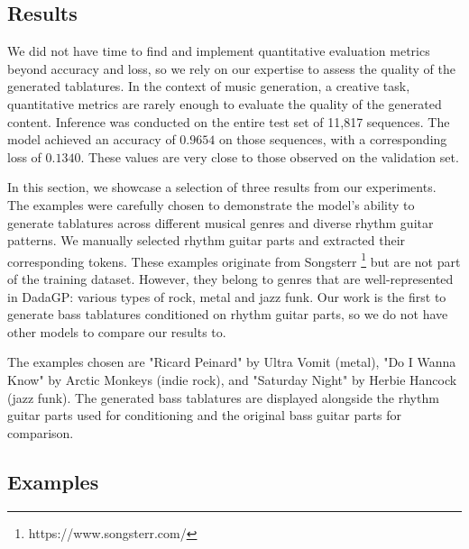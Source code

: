 \subsection{Results}

We did not have time to find and implement quantitative evaluation metrics beyond accuracy and loss, 
so we rely on our expertise to assess the quality of the generated tablatures.
In the context of music generation, a creative task, quantitative metrics are rarely enough to evaluate the quality of the generated content.
Inference was conducted on the entire test set of 11,817 sequences.
The model achieved an accuracy of $0.9654$ on those sequences, with a corresponding loss of $0.1340$.
These values are very close to those observed on the validation set.

In this section, we showcase a selection of three results from our experiments.
The examples were carefully chosen to demonstrate the model's ability to generate tablatures across different musical genres and diverse rhythm guitar patterns.
We manually selected rhythm guitar parts and extracted their corresponding tokens.
These examples originate from Songsterr \footnote{https://www.songsterr.com/} but are not part of the training dataset.
However, they belong to genres that are well-represented in DadaGP: various types of rock, metal and jazz funk.
Our work is the first to generate bass tablatures conditioned on rhythm guitar parts, so we do not have other models to compare our results to.

The examples chosen are "Ricard Peinard" by Ultra Vomit (metal), "Do I Wanna Know" by Arctic Monkeys (indie rock), and "Saturday Night" by Herbie Hancock (jazz funk).
The generated bass tablatures are displayed alongside the rhythm guitar parts used for conditioning and the original bass guitar parts for comparison.

\newpage

\subsection{Examples}


